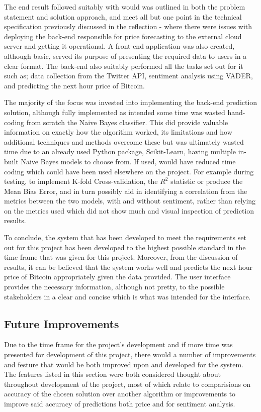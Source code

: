 \documentclass[oneside, 12pt]{article}
\begin{document}
		The end result followed suitably with would was outlined in both the problem statement and solution approach, and meet all but one point in the technical specification previously discussed in the reflection - where there were issues with deploying the back-end responsible for price forecasting to the external cloud server and getting it operational. A front-end application was also created, although basic, served its purpose of presenting the required data to users in a clear format. The back-end also suitably performed all the tasks set out for it such as; data collection from the Twitter API, sentiment analysis using VADER, and predicting the next hour price of Bitcoin.
		
		The majority of the focus was invested into implementing the back-end prediction solution, although fully implemented as intended some time was wasted hand-coding from scratch the Naive Bayes classifier. This did provide valuable information on exactly how the algorithm worked, its limitations and how additional techniques and methods overcome these but was ultimately wasted time due to an already used Python package, Scikit-Learn, having multiple in-built Naive Bayes models to choose from. If used, would have reduced time coding which could have been used elsewhere on the project. For example during testing, to implement K-fold Cross-validation, the $R^2$ statistic or produce the Mean Bias Error, and in turn possibly aid in identifying a correlation from the metrics between the two models, with and without sentiment, rather than relying on the metrics used which did not show much and visual inspection of prediction results.
		
		To conclude, the system that has been developed to meet the requirements set out for this project has been developed to the highest possible standard in the time frame that was given for this project. Moreover, from the discussion of results, it can be believed that the system works well and predicts the next hour price of Bitcoin appropriately given the data provided. The user interface provides the necessary information, although not pretty, to the possible stakeholders in a clear and concise which is what was intended for the interface.
		
		
		\subsection{Future Improvements}
		Due to the time frame for the project's development and if more time was presented for development of this project, there would a number of improvements and festure that would be both improved upon and developed for the system. The features listed in this section were both considered thought about throughout development of the project, most of which relate to comparisions on accuracy of the chosen solution over another algorithm or improvements to improve said accuracy of predictions both price and for sentiment analysis.
		\newline
		
\end{document}
